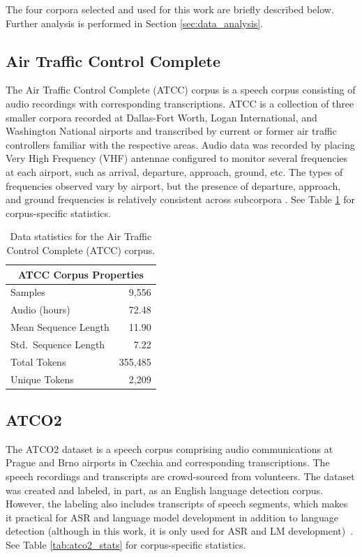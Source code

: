 \documentclass[12pt]{article}
\begin{document}
The four corpora selected and used for this work are briefly described below. Further analysis is performed in Section
\ref{sec:data_analysis}.

\subsection{Air Traffic Control Complete}\label{sec:atcc}
The Air Traffic Control Complete (ATCC) corpus is a speech corpus consisting of audio recordings with corresponding transcriptions. ATCC is a collection of three smaller corpora recorded at Dallas-Fort Worth, Logan International, and Washington National airports and transcribed by current or former air traffic controllers familiar with the respective areas. Audio data was recorded by placing Very High Frequency (VHF) antennae configured to monitor several frequencies at each airport, such as arrival, departure, approach, ground, etc. The types of frequencies observed vary by airport, but the presence of departure, approach, and ground frequencies is relatively consistent across subcorpora \cite{godfrey_air_1994}. See Table \ref{tab:atcc_stats} for corpus-specific statistics.

\begin{table}
    \centering
    \begin{tabular}{l r}
        \toprule
        \multicolumn{2}{c}{ATCC Corpus Properties} \\
        \midrule
        Samples              & 9,556               \\
        Audio (hours)        & 72.48               \\
        Mean Sequence Length & 11.90               \\
        Std.~Sequence Length & 7.22                \\

        Total Tokens         & 355,485             \\
        Unique Tokens        & 2,209               \\
        \bottomrule
    \end{tabular}
    \caption{Data statistics for the Air Traffic Control Complete (ATCC) corpus.}
    \label{tab:atcc_stats}
\end{table}

\subsection{ATCO2}\label{sec:atco2}
The ATCO2 dataset is a speech corpus comprising audio communications at Prague and Brno airports in Czechia and corresponding transcriptions. The speech recordings and transcripts are crowd-sourced from volunteers. The dataset was created and labeled, in part, as an English language detection corpus. However, the labeling also includes transcripts of speech segments, which makes it practical for ASR and language model development in addition to language detection (although in this work, it is only used for ASR and LM development)~\cite{szoke_detecting_2021}.
See Table \ref{tab:atco2_stats} for corpus-specific statistics.
\end{document}
